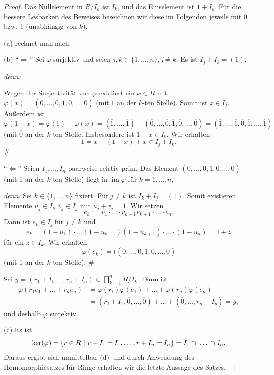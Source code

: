 \documentclass[a4paper, twoside, 11pt, ngerman]{report}
\DeclareMathOperator{\image}{im}
\renewcommand{\cap}{\;\rotatebox{90}{\reflectbox{\rotatebox{270}{$\cup$}}}\;}
\theoremstyle{definistyle}
\theoremstyle{remark}
\newenvironment{denn}%
  {\par\textit{denn:}}%
  {\hfill\#\par}
\begin{document}
\begin{proof}
Das Nullelement in $R / I_k$ ist $I_k$, und das Einselement ist $1 + I_k$. Für die bessere Lesbarkeit des Beweises bezeichnen wir diese im Folgenden jeweils mit $\overline{0}$ bzw. $\overline{1}$ (unabhängig von $k$). 

(a) rechnet man nach.

(b) "`$\Rightarrow$"' Sei $\varphi$ surjektiv und seien $j,k \in \{1, \dots, n\}, j \neq k$. 
Es ist $I_j + I_k = (1)$,
\begin{denn}

Wegen der Surjektivität von $\varphi$ existiert ein $x \in R$ mit $\varphi(x) = (\overline{0}, \dots, \overline{0}, \overline{1}, \overline{0}, \dots, \overline{0})$ (mit $\overline{1}$ an der $k$-ten Stelle). Somit ist $x \in I_j$. 
Außerdem ist
\[
\varphi(1 - x) = \varphi(1) - \varphi(x) = (\overline{1}, \dots, \overline{1}) - (\overline{0}, \dots, \overline{0}, \overline{1}, \overline{0}, \dots, \overline{0})
= (\overline{1}, \dots, \overline{1}, \overline{0}, \overline{1}, \dots, \overline{1}) 
\]
(mit $\overline{0}$ an der $k$-ten Stelle. Insbesondere ist $1-x\in I_k$. Wir erhalten
\[
1 = x + (1 - x) + x \in I_j + I_k.
\]
\end{denn}
"`$\Leftarrow$"' Seien $I_1, \dots, I_n$ paarweise relativ prim. Das Element $(\overline{0}, \ldots, \overline{0},
\overline{1}, \overline{0}, \dots, \overline{0})$ (mit $\overline{1}$ an der $k$-ten Stelle) liegt in  $\image\varphi$ für $k = 1, \dots, n$, 
\begin{denn}
Sei $k \in \{1, \dots, n\}$ fixiert. Für $j \neq k$ ist $I_k + I_j = (1)$. 
Somit existieren Elemente $u_j \in I_k, v_j \in I_j$ mit $u_j + v_j = 1$. Wir setzen 
\[
e_k := v_1 \cdot\ldots\cdot v_{k-1} v_{k+1} \cdot\ldots\cdot v_n.
\]
Dann ist $e_k \in I_j$ für $j\neq k$ und
\[
e_k = (1-u_1)\cdot\ldots(1 - u_{k-1})(1 - u_{k+1}) \cdot\ldots\cdot (1 - u_n)=1+z
\]
für ein $z\in I_k$. Wir erhalten
\[
\varphi(e_k)=((\overline{0}, \dots, \overline{0}, \overline{1}, \overline{0}, \dots, \overline{0})
\]
(mit $\overline{1}$ an der $k$-ten Stelle).
\end{denn}
Sei $y = (r_1 + I_1, \dots, r_n + I_n)\in\prod_{k=1}^n R / I_k$. Dann ist
\begin{align*}
\varphi(r_1 e_1 + \dots + r_n e_n) &= \varphi(r_1) \varphi(e_1) + \dots + \varphi(r_n) \varphi(e_n)\\
&= (r_1 + I_1, \overline{0}, \dots, \overline{0}) + \dots + (\overline{0}, \dots, r_n + I_n) = y,
\end{align*}
und deshalb $\varphi$ surjektiv.

(c) Es ist
\[
\ker(\varphi)=\{r\in R \ | \ r+I_1=I_1,\ldots, r+I_n=I_n\}=I_1\cap\ldots\cap I_n.
\]
Daraus ergibt sich unmittelbar (d), und durch Anwendung des Homomorphiesatzes für Ringe erhalten wir die letzte Aussage des Satzes.
\end{proof}
\end{document}
